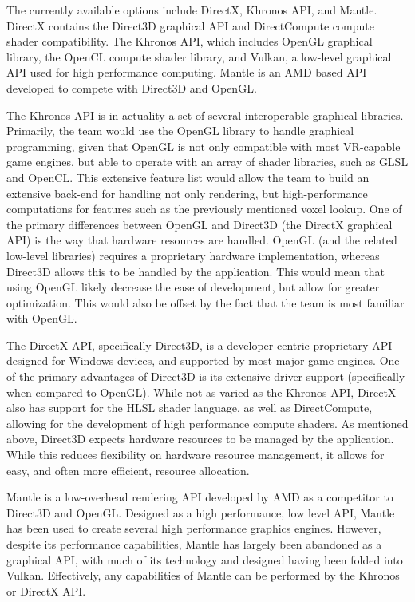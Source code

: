 \documentclass[onecolumn, draftclsnofoot,10pt, compsoc]{IEEEtran}
\newcounter{threesection}[subsubsection]
\newcounter{foursection}[threesection]
\begin{document}
The currently available options include DirectX, Khronos API, and Mantle. DirectX contains the Direct3D graphical API and DirectCompute compute shader compatibility. The Khronos API, which includes OpenGL graphical library, the OpenCL compute shader library, and Vulkan, a low-level graphical API used for high performance computing. Mantle is an AMD based API developed to compete with Direct3D and OpenGL. 

The Khronos API is in actuality a set of several interoperable graphical libraries. Primarily, the team would use the OpenGL library to handle graphical programming, given that OpenGL is not only compatible with most VR-capable game engines, but able to operate with an array of shader libraries, such as GLSL and OpenCL. This extensive feature list would allow the team to build an extensive back-end for handling not only rendering, but high-performance computations for features such as the previously mentioned voxel lookup. One of the primary differences between OpenGL and Direct3D (the DirectX graphical API) is the way that hardware resources are handled. OpenGL (and the related low-level libraries) requires a proprietary hardware implementation, whereas Direct3D allows this to be handled by the application. This would mean that using OpenGL likely decrease the ease of development, but allow for greater optimization. This would also be offset by the fact that the team is most familiar with OpenGL.

The DirectX API, specifically Direct3D, is a developer-centric proprietary API designed for Windows devices, and supported by most major game engines. One of the primary advantages of Direct3D is its extensive driver support (specifically when compared to OpenGL). While not as varied as the Khronos API, DirectX also has support for the HLSL shader language, as well as DirectCompute, allowing for the development of high performance compute shaders. As mentioned above, Direct3D expects hardware resources to be managed by the application. While this reduces flexibility on hardware resource management, it allows for easy, and often more efficient, resource allocation.

Mantle is a low-overhead rendering API developed by AMD as a competitor to Direct3D and OpenGL. Designed as a high performance, low level API, Mantle has been used to create several high performance graphics engines. However, despite its performance capabilities, Mantle has largely been abandoned as a graphical API, with much of its technology and designed having been folded into Vulkan. Effectively, any capabilities of Mantle can be performed by the Khronos or DirectX API.
\end{document}
